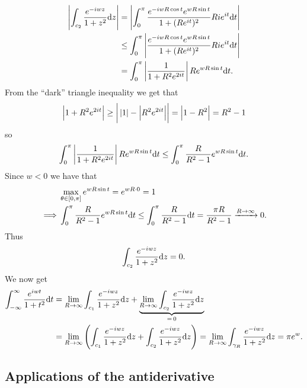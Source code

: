 \documentclass[11pt,a4paper]{article}
\begin{document}
\begin{solution}
\begin{enumerate}
\begin{align*}
      \left\lvert\int_{c_2} \frac{e^{-i w z}}{1 + z^2} \mathrm{d} z\right\rvert &=
      \left\lvert\int_{0}^{\pi}
      \frac{e^{-i w R \cos t}e^{w R \sin t}}
      {1 + (R e^{i t})^2} R i e^{i t} \mathrm{d} t\right\rvert \\ &\le
      \int_{0}^{\pi} \left\lvert
      \frac{e^{-i w R \cos t}e^{w R \sin t}}
    {1 + (R e^{i t})^2} R i e^{i t} \mathrm{d} t\right\rvert \\ &=
      \int_{0}^{\pi} \left\lvert
      \frac{1}{1 + R^2 e^{2 i t}}\right\rvert R e^{w R \sin t} \mathrm{d} t.
    \end{align*}
    From the ``dark'' triangle inequality we get that
    \[
      \left\lvert1 + R^2 e^{2 i t}\right\rvert \geq
      \left\lvert\,\left\lvert1\right\rvert - \left\lvert R^2 e^{2 i t}\right\rvert\right\rvert = \left\lvert1 - R^2\right\rvert = R^2 - 1
    \]
    so
    \[
      \int_{0}^{\pi} \left\lvert
      \frac{1}{1 + R^2 e^{2 i t}}\right\rvert R e^{w R \sin t} \mathrm{d} t \le
      \int_{0}^{\pi} \frac{R}{R^2 - 1} e^{w R \sin t} \mathrm{d} t.
    \]
    Since $w < 0$ we have that
    \begin{align*}
      &\max_{\theta \in [0,\pi]} e^{w R \sin t} = e^{w R \cdot 0} = 1 
      \\ \implies
      &\int_{0}^{\pi} \frac{R}{R^2 - 1} e^{w R \sin t} \mathrm{d} t \le
      \int_{0}^{\pi} \frac{R}{R^2 - 1} \mathrm{d} t =
      \frac{\pi R}{R^2 - 1} \xrightarrow{R \to \infty} 0.
    \end{align*}
    Thus
    \[
      \int_{c_2} \frac{e^{-i w z}}{1 + z^2} \mathrm{d} z = 0.
    \]
    We now get
    \begin{align*}
      \int_{\ninfty}^{\infty} \frac{e^{i w t}}{1 + t^2} \dt &=
      \lim_{R \to \infty}
      \int_{c_1} \frac{e^{-i w z}}{1 + z^2} \dz +
      \underbrace{\lim_{R \to \infty}
      \int_{c_2} \frac{e^{-i w z}}{1 + z^2} \dz}_{=\,0} \\ &=
      \lim_{R \to \infty} \del{\int_{c_1} \frac{e^{-i w z}}{1 + z^2} \dz +
      \int_{c_2} \frac{e^{-i w z}}{1 + z^2} \dz} =
      \lim_{R \to \infty} \int_{\gamma_R} \frac{e^{-i w z}}{1 + z^2} \dz =
      \pi e^{w}.
    \end{align*}
\end{enumerate}
\end{solution}

\subsection{Applications of the antiderivative}
\end{document}
